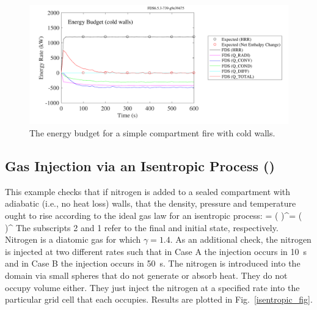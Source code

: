 \documentclass[11pt]{book}
\begin{document}
\begin{figure}[ht]
\centering
\includegraphics[width=.8\textwidth]{SCRIPT_FIGURES/energy_budget_cold_walls}
\caption[The {\ct energy\_budget\_cold\_walls} test case]{The energy budget for a simple compartment fire with cold walls.}
\label{energy_budget_cold_walls_fig}
\end{figure}


\subsection{Gas Injection via an Isentropic Process (\texorpdfstring{}{isentropic})}
\label{isentropic}

This example checks that if nitrogen is added to a sealed compartment with adiabatic (i.e., no heat loss) walls, that the density, pressure and temperature ought to rise according to the ideal gas law for an isentropic process: \be {} = \left(  \right)^\gamma = \left(  \right)^{}  \ee The subscripts 2 and 1 refer to the final and initial state, respectively. Nitrogen is a diatomic gas for which $\gamma=1.4$. As an additional check, the nitrogen is injected at two different rates such that in Case A the injection occurs in 10~s and in Case B the injection occurs in 50~s. The nitrogen is introduced into the domain via small spheres that do not generate or absorb heat. They do not occupy volume either. They just inject the nitrogen at a specified rate into the particular grid cell that each occupies.  Results are plotted in Fig.~\ref{isentropic_fig}.
\end{document}
